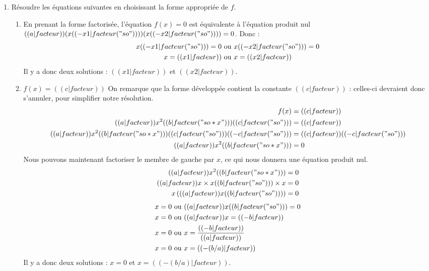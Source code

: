 \begin{enumerate}
\begin{enumerate}
\end{enumerate}
\item Résoudre les équations suivantes en choisissant la forme appropriée de $f$.
\begin{enumerate}
\item En prenant la forme factorisée, l'équation $f(x)=0$ est équivalente à l'équation produit nul $(( a|facteur ))(x (( -x1|facteur("so") )) )(x (( -x2|facteur("so") )) ) = 0$. Donc :
\begin{align*}
x (( -x1|facteur("so") ))=0 &\text{ ou } x (( -x2|facteur("so") ))=0 \\
x=(( x1|facteur )) &\text{ ou } x=(( x2|facteur ))
\end{align*}
Il y a donc deux solutions : $(( x1|facteur ))$ et $(( x2|facteur ))$.
\item $f(x)=(( c|facteur ))$ On remarque que la forme développée contient la constante $(( c|facteur ))$ : celles-ci devraient donc s'annuler, pour simplifier notre résolution.
\begin{align*}
f(x) &= (( c|facteur )) \\
(( a|facteur ))x^2 (( b|facteur("so*x") )) (( c|facteur("so") )) &= (( c|facteur )) \\
(( a|facteur ))x^2 (( b|facteur("so*x") )) (( c|facteur("so") )) (( -c|facteur("so") )) &= (( c|facteur )) (( -c|facteur("so") )) \\
(( a|facteur ))x^2 (( b|facteur("so*x") )) &= 0 \\
\end{align*}
Nous pouvons maintenant factoriser le membre de gauche par $x$, ce qui nous donnera une équation produit nul.
\begin{align*}
(( a|facteur ))x^2 (( b|facteur("so*x") )) &= 0 \\
(( a|facteur ))x\times x (( b|facteur("so") ))\times x &= 0 \\
x\left( (( a|facteur ))x (( b|facteur("so") )) \right) &= 0 \\
\end{align*}
\begin{align*}
x =0 &\text{ ou } (( a|facteur ))x (( b|facteur("so") ))=0 \\
x =0 &\text{ ou } (( a|facteur ))x =(( -b|facteur )) \\
x =0 &\text{ ou } x = \frac{(( -b|facteur ))}{(( a|facteur ))} \\
x =0 &\text{ ou } x = (( -(b/a)|facteur )) \\
\end{align*}
Il y a donc deux solutions : $x=0$ et $x=(( -(b/a)|facteur ))$.

\end{enumerate}
\end{enumerate}
